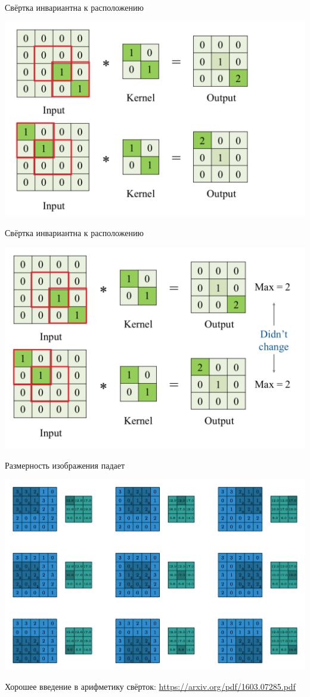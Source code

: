 \documentclass[notes,12pt, aspectratio=169]{beamer}
\begin{document}
\begin{frame}{Свёртка инвариантна к расположению}
\begin{center}
	\includegraphics[width=.8\linewidth]{conv_3.png}
\end{center}
\end{frame}


\begin{frame}{Свёртка инвариантна к расположению}
\begin{center}
	\includegraphics[width=.8\linewidth]{conv_4.png}
\end{center}
\end{frame}


\begin{frame}{Размерность изображения падает}
\begin{center}
	\includegraphics[width=.8\linewidth]{step_by_step_conv.png}
\end{center}

\vfill %
\footnotesize
Хорошее введение в арифметику свёрток: {\color{blue} \url{https://arxiv.org/pdf/1603.07285.pdf}}
\end{frame}
\end{document}
